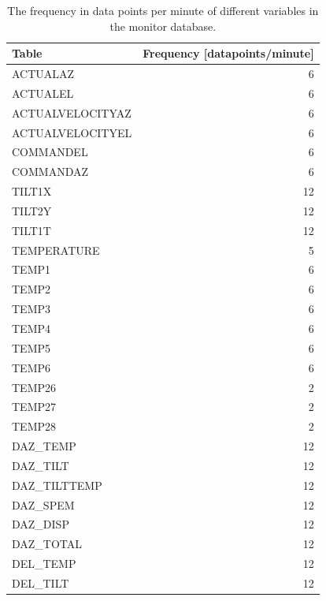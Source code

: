 \begin{table}[H]
    \caption{The frequency in data points per minute of different variables in the monitor database.}
    \centering
    \begin{tabular}{lr}
        \toprule
        Table &  Frequency [datapoints/minute] \\
        \midrule
        ACTUALAZ &                    6 \\
        ACTUALEL &                    6 \\
        ACTUALVELOCITYAZ &                    6 \\
        ACTUALVELOCITYEL &                    6 \\
        COMMANDEL &                    6 \\
        COMMANDAZ &                    6 \\
        TILT1X &                   12 \\
        TILT2Y &                   12 \\
        TILT1T &                   12 \\
        TEMPERATURE &                    5 \\
        TEMP1 &                    6 \\
        TEMP2 &                    6 \\
        TEMP3 &                    6 \\
        TEMP4 &                    6 \\
        TEMP5 &                    6 \\
        TEMP6 &                    6 \\
        TEMP26 &                    2 \\
        TEMP27 &                    2 \\
        TEMP28 &                    2 \\
        DAZ\_TEMP &                   12 \\
        DAZ\_TILT &                   12 \\
        DAZ\_TILTTEMP &                   12 \\
        DAZ\_SPEM &                   12 \\
        DAZ\_DISP &                   12 \\
        DAZ\_TOTAL &                   12 \\
        DEL\_TEMP &                   12 \\
        DEL\_TILT &                   12 \\

\end{tabular}
\end{table}
